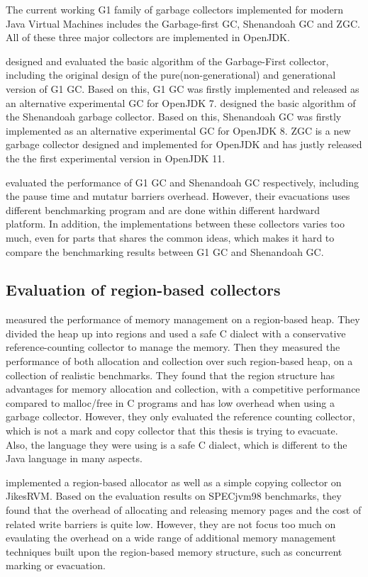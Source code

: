 The current working G1 family of garbage collectors implemented for modern Java Virtual Machines
includes the Garbage-first GC, Shenandoah GC and ZGC.
All of these three major collectors are implemented in OpenJDK.

\cite{detlefs2004garbage} designed and evaluated the basic algorithm of the Garbage-First collector,
including the original design of the pure(non-generational) and generational version
of G1 GC. Based on this, G1 GC was firstly implemented and released as an alternative
experimental GC for OpenJDK 7. \cite{flood2016shenandoah} designed the basic algorithm
of the Shenandoah garbage collector.
Based on this, Shenandoah GC was firstly implemented as an alternative experimental GC for OpenJDK 8.
ZGC is a new garbage collector designed and implemented for OpenJDK
and has justly released the the first experimental version in OpenJDK 11.

\citep{detlefs2004garbage,flood2016shenandoah} evaluated the performance of G1 GC
and Shenandoah GC respectively, including the pause time and mutatur barriers overhead.
However, their evacuations uses different benchmarking program and are done within
different hardward platform. In addition, the implementations between these collectors
varies too much, even for parts that shares the common ideas, which makes it hard to
compare the benchmarking results between G1 GC and Shenandoah GC.

\subsection{Evaluation of region-based collectors}

\cite{gay1998memory} measured the performance of memory management on a region-based heap.
They divided the heap up into regions and used a safe C dialect
with a conservative reference-counting collector to manage the memory. Then they
measured the performance of both allocation and collection over such region-based heap,
on a collection of realistic benchmarks. They found that the region structure has
advantages for memory allocation and collection, with a competitive performance
compared to malloc/free in C programs and has low overhead when using a garbage collector.
However, they only evaluated the reference counting collector, which is not a
mark and copy collector that this thesis is trying to evacuate. Also, the
language they were using is a safe C dialect, which is different to the Java language
in many aspects.

\cite{qian2002adaptive} implemented a region-based allocator as well as a simple copying
collector on JikesRVM. Based on the evaluation results on SPECjvm98 benchmarks,
they found that the overhead of allocating and releasing memory pages
and the cost of related write barriers is quite low.
However, they are not focus too much on evaulating the overhead on a wide range of
additional memory management techniques built upon the region-based memory structure,
such as concurrent marking or evacuation.

